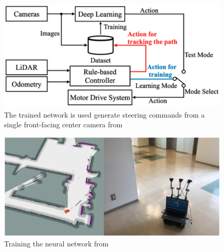 \begin{figure}[hbtp]
     \centering
     \includegraphics[keepaspectratio, scale=0.5]
          {images/okada_structure.png}
     \caption{The trained network is used generate steering commands from a single front-facing center camera from \cite{okada1}}
     \label{Fig:okada_structure}
\end{figure}

\begin{figure}[hbtp]
     \centering
    \includegraphics[keepaspectratio, scale=0.5]
         {images/okada_nav.png}
    \caption{Training the neural network from \cite{okada1}}
    \label{Fig:okada_nav}
   \end{figure}

\newpage
